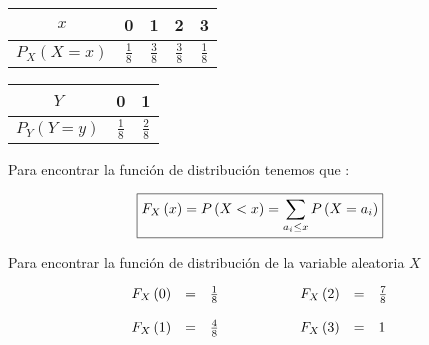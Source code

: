 \documentclass[12pt]{article}
\begin{document}
\begin{center}
    \renewcommand{\arraystretch}{1.5}
    \begin{tabular}{|c|c|c|c|c|}
        \hline
        $x$                   & 0             & 1             & 2             & 3
        \\
        \hline
        $P_X\left(X=x\right)$ & $\frac{1}{8}$ & $\frac{3}{8}$ & $\frac{3}{8}$ & $\frac{1}{8}$
        \\
        \hline
    \end{tabular}
\end{center}


\begin{center}
    \renewcommand{\arraystretch}{1.5}
    \begin{tabular}{|c|c|c|}
        \hline
        $Y$                   & 0             & 1
        \\
        \hline
        $P_Y\left(Y=y\right)$ & $\frac{1}{8}$ & $\frac{2}{8}$
        \\
        \hline
    \end{tabular}
\end{center}


\begin{flushleft}
    Para encontrar la funci\'on de distribuci\'on tenemos que :
\end{flushleft}



\begin{equation*}
    \fbox{$\displaystyle
            F_X\left(x\right) = P \left(X <x\right) =  \sum_{a_i\le x} P \left(X = a_i\right)
        $}
\end{equation*}


\begin{flushleft}
    Para encontrar la funci\'on de distribuci\'on de la variable aleatoria $X$
\end{flushleft}


\begin{equation*}
    \begin{array}{cp{1cm}c}


        \begin{array}{rcl}
            F_X\left(0\right) & = & \frac{1}{8}
            \\
            \\
            F_X\left(1\right) & = & \frac{4}{8}
        \end{array}
         &
         &
        \begin{array}{rcl}
            F_X\left(2\right) & = & \frac{7}{8}
            \\
            \\
            F_X\left(3\right) & = & 1
        \end{array}
    \end{array}
\end{equation*}
\end{document}
